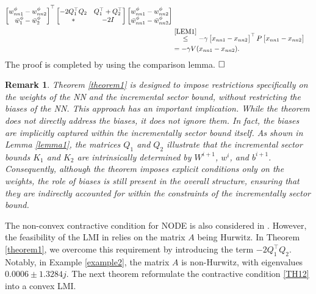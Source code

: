 \documentclass[journal,twoside,web]{ieeecolor}
\renewenvironment{proof}{\vspace{.1cm}\noindent{\sc Proof.}\hspace{0.10cm}\,\,}{$\hfill\Box$\vspace{.1cm}}
\newtheorem{remark}	      [theorem]{Remark}
\newcommand{\bbm}[1]{\left[\begin{matrix} #1 \end{matrix}\right]}
\begin{document}
\begin{proof}
\begin{equation}
\begin{aligned}
\begin{bmatrix}
w_{nn1}^{\phi}-w_{nn2}^{\phi}
 \\
\bar{w}_1^{\phi}-\bar{w}_2^{\phi}
\end{bmatrix}^\top \begin{bmatrix}
 -2Q_1^\top Q_2&Q_1^\top+Q_2^\top
 \\
\ast&-2I
\end{bmatrix}\begin{bmatrix}
w_{nn1}^{\phi}-w_{nn2}^{\phi}
 \\
\bar{w}_{nn1}^{\phi}-\bar{w}_{nn2}^{\phi}
\end{bmatrix}\\&\overset{\eqref{LEM1}}{\leq}  -\gamma \bbm{x_{nn1}-x_{nn2}}^\top P \bbm{x_{nn1}-x_{nn2}}\\&=-\gamma V(x_{nn1}-x_{nn2}).
\end{aligned}
\end{equation}
The proof is completed by using the comparison lemma.
 \end{proof}
 
\begin{remark}\label{REM0}
Theorem \ref{theorem1} is designed to impose restrictions specifically on the weights of the NN and the incremental sector bound, without restricting the biases of the NN. This approach has an important implication. While the theorem does not directly address the biases, it does not ignore them. In fact, the biases are implicitly captured within the incrementally sector bound itself. As shown in Lemma \ref{lemma1}, the matrices $Q_1$ and $Q_2$ illustrate that the incremental sector bounds $K_1$ and $K_2$ are intrinsically determined by $W^{i+1}$, $w^i$, and $b^{i+1}$. Consequently, although the theorem imposes explicit conditions only on the weights, the role of biases is still present in the overall structure, ensuring that they are indirectly accounted for within the constraints of the incrementally sector bound.  
\end{remark}

The non-convex contractive condition for NODE is also considered in \cite{martinelli2023unconstrained}. However, the feasibility of the LMI in \cite[Thm.1]{martinelli2023unconstrained} relies on the matrix $A$ being Hurwitz. In Theorem \ref{theorem1}, we overcome this requirement by introducing the term $-2Q_1^\top Q_2$. Notably, in Example \ref{example2}, the matrix $A$ is non-Hurwitz, with eigenvalues $0.0006\pm1.3284j$. The next theorem reformulate the contractive condition \eqref{TH12} into a convex LMI.
\end{document}
